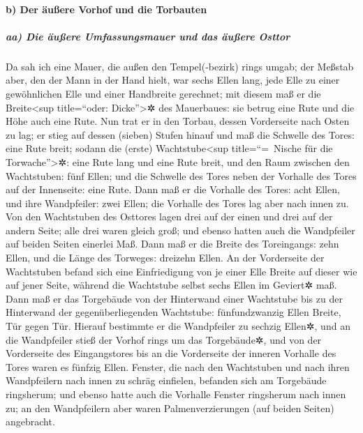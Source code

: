 \hypertarget{b-der-uxe4uuxdfere-vorhof-und-die-torbauten}{%
\paragraph{b) Der äußere Vorhof und die
Torbauten}\label{b-der-uxe4uuxdfere-vorhof-und-die-torbauten}}

\hypertarget{aa-die-uxe4uuxdfere-umfassungsmauer-und-das-uxe4uuxdfere-osttor}{%
\subparagraph{aa) Die äußere Umfassungsmauer und das äußere
Osttor}\label{aa-die-uxe4uuxdfere-umfassungsmauer-und-das-uxe4uuxdfere-osttor}}

Da sah ich eine Mauer, die außen den Tempel(-bezirk) rings
umgab; der Meßstab aber, den der Mann in der Hand hielt, war sechs Ellen
lang, jede Elle zu einer gewöhnlichen Elle und einer Handbreite
gerechnet; mit diesem maß er die Breite\textless sup title=``oder:
Dicke''\textgreater✲ des Mauerbaues: sie betrug eine Rute und die Höhe
auch eine Rute. Nun trat er in den Torbau, dessen
Vorderseite nach Osten zu lag; er stieg auf dessen (sieben) Stufen
hinauf und maß die Schwelle des Tores: eine Rute breit;
sodann die (erste) Wachtstube\textless sup
title=``=~Nische für die Torwache''\textgreater✲: eine Rute lang und
eine Rute breit, und den Raum zwischen den Wachtstuben: fünf Ellen; und
die Schwelle des Tores neben der Vorhalle des Tores auf der Innenseite:
eine Rute. Dann maß er die Vorhalle des Tores:
acht Ellen, und ihre Wandpfeiler: zwei Ellen; die Vorhalle
des Tores lag aber nach innen zu. Von den Wachtstuben des
Osttores lagen drei auf der einen und drei auf der andern Seite; alle
drei waren gleich groß; und ebenso hatten auch die Wandpfeiler auf
beiden Seiten einerlei Maß. Dann maß er die Breite des
Toreingangs: zehn Ellen, und die Länge des Torweges: dreizehn Ellen.
An der Vorderseite der Wachtstuben befand sich eine
Einfriedigung von je einer Elle Breite auf dieser wie auf jener Seite,
während die Wachtstube selbst sechs Ellen im Geviert✲ maß.
Dann maß er das Torgebäude von der Hinterwand einer
Wachtstube bis zu der Hinterwand der gegenüberliegenden Wachtstube:
fünfundzwanzig Ellen Breite, Tür gegen Tür. Hierauf
bestimmte er die Wandpfeiler zu sechzig Ellen✲, und an die Wandpfeiler
stieß der Vorhof rings um das Torgebäude✲, und von der
Vorderseite des Eingangstores bis an die Vorderseite der inneren
Vorhalle des Tores waren es fünfzig Ellen. Fenster, die
nach den Wachtstuben und nach ihren Wandpfeilern nach innen zu schräg
einfielen, befanden sich am Torgebäude ringsherum; und ebenso hatte auch
die Vorhalle Fenster ringsherum nach innen zu; an den Wandpfeilern aber
waren Palmenverzierungen (auf beiden Seiten) angebracht.

